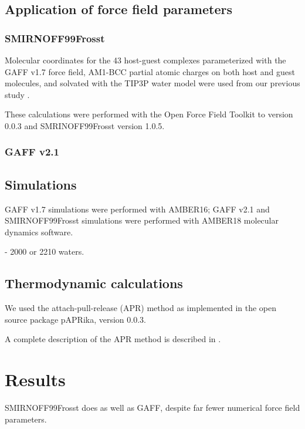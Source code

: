 \documentclass[9pt,lineno]{elife}
\newcommand{\drsnote}[1]{ {\textcolor{red} { [DRS: #1] }}}
\newcommand{\drsnote}[1]{}
\begin{document}
\subsection{Application of force field parameters}
\subsubsection{SMIRNOFF99Frosst}


Molecular coordinates for the 43 host-guest complexes parameterized with the GAFF v1.7 force field, AM1-BCC partial atomic charges on both host and guest molecules, and solvated with the TIP3P water model were used from our previous study \cite{henriksen_evaluating_2017}.

These calculations were performed with the Open Force Field Toolkit to version 0.0.3 and SMRINOFF99Frosst version 1.0.5.

\subsubsection{GAFF v2.1}

\subsection{Simulations}
GAFF v1.7 simulations were performed with AMBER16; GAFF v2.1 and SMIRNOFF99Frosst simulations were performed with AMBER18 molecular dynamics software.

- 2000 or 2210 waters.





\subsection{Thermodynamic calculations}
We used the attach-pull-release (APR) method as implemented in the open source package pAPRika, version 0.0.3.

A complete description of the APR method is described in \cite{henriksen_computational_2015}.

\section{Results}
SMIRNOFF99Frosst does as well as GAFF, despite far fewer numerical force field parameters.
\end{document}
